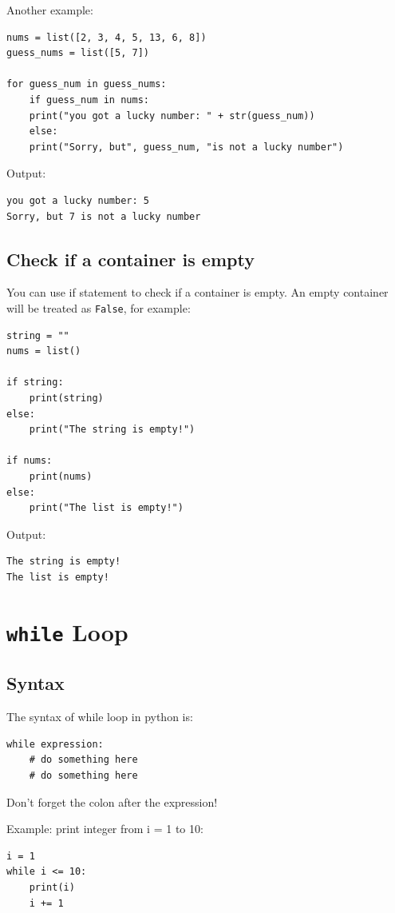 \documentclass[12pt]{book}
\begin{document}
Another example:
\begin{verbatim}
nums = list([2, 3, 4, 5, 13, 6, 8])
guess_nums = list([5, 7])

for guess_num in guess_nums:
    if guess_num in nums:
	print("you got a lucky number: " + str(guess_num))
    else:
	print("Sorry, but", guess_num, "is not a lucky number")
\end{verbatim}
Output:
\begin{verbatim}
you got a lucky number: 5
Sorry, but 7 is not a lucky number
\end{verbatim}

\subsection{Check if a container is empty}
\label{sec:org6c1edce}
You can use if statement to check if a container is empty. An empty container will be treated as \texttt{False}, for example:
\begin{verbatim}
string = ""
nums = list()

if string:
    print(string)
else:
    print("The string is empty!")

if nums:
    print(nums)
else:
    print("The list is empty!")
\end{verbatim}
Output:
\begin{verbatim}
The string is empty!
The list is empty!
\end{verbatim}

\section{\texttt{while} Loop}
\label{sec:org91fa523}
\subsection{Syntax}
\label{sec:org5b7bd56}
The syntax of while loop in python is:
\begin{verbatim}
while expression:
    # do something here
    # do something here
\end{verbatim}
Don't forget the colon after the expression!

Example: print integer from i = 1 to 10:
\begin{verbatim}
i = 1
while i <= 10:
    print(i)
    i += 1
\end{verbatim}
\end{document}
